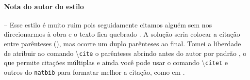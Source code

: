 \documentclass[11pt]{article}
\begin{document}
\paragraph{Nota do autor do estilo} -- Esse estilo é muito ruim pois
seguidamente citamos alguém sem nos direcionarmos à obra e o texto fica
quebrado \citet{knuth:84}.
A solução seria colocar a citação entre parênteses (\citet{knuth:84}),
mas ocorre um duplo parênteses ao final.
Tomei a liberdade de atribuir ao comando \textbackslash{\texttt{cite}} o
parênteses abrindo antes do autor por padrão \cite{knuth:84}, o que permite
citações múltiplas \cite{knuth:84, boulic:91, smith:99} e ainda você pode
usar o comando \textbackslash{\texttt{citet}} e outros do \texttt{natbib}
para formatar melhor a citação, como em \citet{knuth:84}.
 



\end{document}
